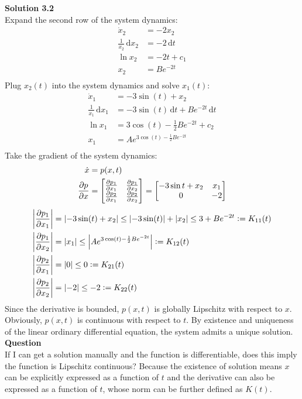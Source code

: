 \documentclass[a4paper,10.5pt]{article}
\newcommand{\defeq}{\vcentcolon=}
\newcommand{\dt}{\, \mathrm{d} t}
\newcommand{\dx}{\, \mathrm{d} x}
\newcommand{\abs}[1]{\left|#1\right|}
\newenvironment{mymat}{\left[\begin{matrix}}{\end{matrix}\right]}
\begin{document}
\noindent \textbf {Solution 3.2} \\
Expand the second row of the system dynamics:
\begin{align*}
	\dot{x}_2 &= -2x_2 \\
	\frac{1}{x_2} \dx _2 &= -2 \dt \\
	\ln x_2 &= -2t + c_1 \\
	x_2 &= Be^{-2t} \\
\end{align*}
Plug $x_2(t)$ into the system dynamics and solve $x_1(t)$:
\begin{align*}
	\dot{x}_1 &= -3 \sin (t) + x_2 \\
	\frac{1}{x_1}\dx _1 &= -3\sin (t) \dt + Be^{-2t}\dt \\
	\ln x_1 &= 3 \cos(t) - \frac{1}{2} Be^{-2t} + c_2\\
	x_1 &= Ae^{3 \cos(t)- \frac{1}{2} Be^{-2t}}\\
\end{align*}
Take the gradient of the system dynamics:
\begin{align*}
\dot{x} &= p(x,t) \\
\frac{\partial p}{\partial x} &=  \begin{mymat}\frac{\partial p_1}{\partial x_1} & \frac{\partial p_1}{\partial x_2} \\
\frac{\partial p_2}{\partial x_1} & \frac{\partial p_2}{\partial x_2}
\end{mymat} = \begin{mymat}
-3\sin t + x_2 & x_1 \\
0 & -2
\end{mymat}
\end{align*}
\begin{align*}
\abs{\frac{\partial p_1}{\partial x_1}} &= \abs{-3\sin(t)+x_2} \leq \abs{-3\sin(t)} + \abs{x_2} \leq 3 + Be^{-2t} \defeq K_{11}(t)\\
\abs{\frac{\partial p_1}{\partial x_2}} &= \abs{x_1} \leq \abs{Ae^{3 \cos(t)- \frac{1}{2} Be^{-2t}}} \defeq K_{12}(t) \\
\abs{\frac{\partial p_2}{\partial x_1}} &= \abs{0} \leq 0 \defeq K_{21}(t) \\
\abs{\frac{\partial p_2}{\partial x_2}} &= \abs{-2} \leq -2 \defeq K_{22}(t)
\end{align*}
Since the derivative is bounded, $p(x,t)$ is globally Lipschitz with respect to $x$. Obviously, $p(x,t)$ is continuous with respect to $t$. By existence and uniqueness of the linear ordinary differential equation, the system admits a unique solution. \\

\textbf{Question} \\

If I can get a solution manually and the function is differentiable, does this imply the function is Lipschitz continuous? Because the existence of solution means $x$ can be explicitly expressed as a function of $t$ and the derivative can also be expressed as a function of $t$, whose norm can be further defined as $K(t)$.
\end{document}
